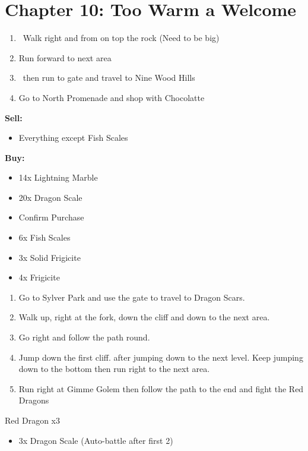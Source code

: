 \chapter{Chapter 10: Too Warm a Welcome}
\begin{enumerate}
	\item \cs\, Walk right and  from on top the rock (Need to be big)
	\item Run forward to next area
	\item \cs\ then run to gate and travel to Nine Wood Hills
	\item Go to North Promenade and shop with Chocolatte
\end{enumerate}
\begin{shop}
\textbf{Sell:}
	\begin{itemize}
		\item Everything except Fish Scales
	\end{itemize}
\textbf{Buy:}
	\begin{itemize}
		\item 14x Lightning Marble
		\item 20x Dragon Scale
		\item Confirm Purchase
		\item 6x Fish Scales
		\item 3x Solid Frigicite
		\item 4x Frigicite
	\end{itemize}
\end{shop}
\begin{enumerate}[resume]
	\item Go to Sylver Park and use the gate to travel to Dragon Scars.
	\item Walk up, right at the fork, down the cliff and down to the next area.
	\item Go right and follow the path round.
	\item Jump down the first cliff.  after jumping down to the next level. Keep jumping down to the bottom then run right to the next area.
	\item Run right at Gimme Golem then follow the path to the end and fight the Red Dragons
\end{enumerate}
\begin{battle}[]{Red Dragon x3}
	\begin{itemize}
		\item 3x Dragon Scale (Auto-battle after first 2)
	\end{itemize}
\end{battle}
